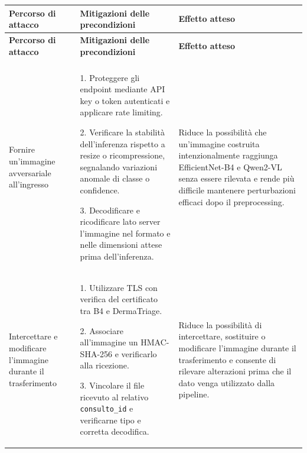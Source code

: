 {
\small
{}
\setlength{\tabcolsep}{4pt}
\renewcommand{\arraystretch}{1.07}

\begin{xltabular}{\textwidth}{
    >{\raggedright\arraybackslash}p{3.1cm}
    X
    X
}

\toprule

\textbf{Percorso di attacco} &
\textbf{Mitigazioni delle precondizioni} &
\textbf{Effetto atteso} \\

\midrule

\endfirsthead

\toprule

\textbf{Percorso di attacco} &
\textbf{Mitigazioni delle precondizioni} &
\textbf{Effetto atteso} \\

\midrule

\endhead

 \\
\endfoot

\endlastfoot


Fornire un'immagine avversariale all'ingresso &

1. Proteggere gli endpoint mediante API key o token autenticati e applicare
rate limiting.

2. Verificare la stabilità dell'inferenza rispetto a resize o ricompressione,
segnalando variazioni anomale di classe o confidence.

3. Decodificare e ricodificare lato server l'immagine nel formato e nelle
dimensioni attese prima dell'inferenza. &

Riduce la possibilità che un'immagine costruita intenzionalmente raggiunga
EfficientNet-B4 e Qwen2-VL senza essere rilevata e rende più difficile
mantenere perturbazioni efficaci dopo il preprocessing. \\

\midrule


Intercettare e modificare l'immagine durante il trasferimento &

1. Utilizzare TLS con verifica del certificato tra B4 e DermaTriage.

2. Associare all'immagine un HMAC-SHA-256 e verificarlo alla ricezione.

3. Vincolare il file ricevuto al relativo \texttt{consulto\_id} e verificarne
tipo e corretta decodifica. &

Riduce la possibilità di intercettare, sostituire o modificare l'immagine
durante il trasferimento e consente di rilevare alterazioni prima che il dato
venga utilizzato dalla pipeline. \\


\end{xltabular}}
